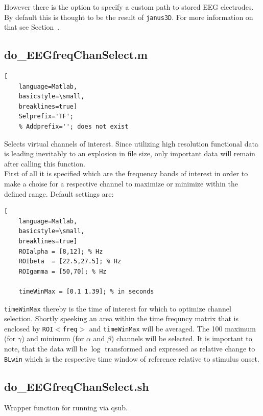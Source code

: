 \documentclass[12pt,a4paper]{scrartcl}
\begin{document}
\noindent However there is the option to specify a custom path to stored EEG electrodes. By default this is thought to be the result of \texttt{janus3D}. For more information on that see Section~.

\subsection{do\_EEGfreqChanSelect.m}
\label{m:selchan}
\begin{lstlisting}[
    language=Matlab,
    basicstyle=\small,
    breaklines=true]
    Selprefix='TF';
    % Addprefix=''; does not exist
\end{lstlisting}
Selects virtual channels of interest. Since utilizing high resolution functional data is leading inevitably to an explosion in file size, only important data will remain after calling this function.\\

\noindent First of all it is specified which are the frequency bands of interest in order to make a choise for a respective channel to maximize or minimize within the defined range. Default settings are:
\begin{lstlisting}[
    language=Matlab,
    basicstyle=\small,
    breaklines=true]
    ROIalpha = [8,12]; % Hz
    ROIbeta  = [22.5,27.5]; % Hz
    ROIgamma = [50,70]; % Hz

    timeWinMax = [0.1 1.39]; % in seconds
\end{lstlisting}

\texttt{timeWinMax} thereby is the time of interest for which to optimize channel selection. Shortly speeking an area within the time frequncy matrix that is enclosed by \texttt{ROI$<$freq$>$} and \texttt{timeWinMax} will be averaged. The 100 maximum (for $\gamma$) and minimum (for $\alpha$ and $\beta$) channels will be selected. It is important to note, that the data will be $\log$ transformed and expressed as relative change to \texttt{BLwin} which is the respective time window of reference relative to stimulus onset.\\

\subsection{do\_EEGfreqChanSelect.sh}
\label{sh:selchan}
Wrapper function for running \texttt{} via qsub.\\
\end{document}
